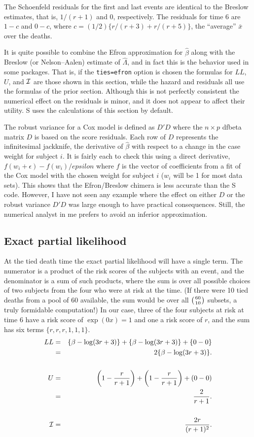 \documentclass[11pt]{article}
\def\bhat{\hat \beta}        %
\def\xbar{\bar x}
\def\lhat{\hat \Lambda}
\def\imat{{\cal I}}
\begin{document}
The Schoenfeld residuals for the first and last events are identical to
the Breslow estimates, that is, $1/(r+1)$ and 0, respectively.
The residuals for time 6 are $1-c$ and $0-c$, where
$c= (1/2)\{r/(r+3) + r/(r+5)\}$, the ``average'' $\xbar$ over the deaths.

It is quite possible to combine the Efron approximation for $\bhat$
along with the Breslow (or Nelson--Aalen) estimate of $\lhat$,
and in fact this is the behavior used in some packages.
That is, if the \texttt{ties=efron} option is chosen the formulas for
$LL$, $U$, and $\imat$ are those shown in this section,
while the hazard and residuals all use the formulas of the prior section.
Although this is not perfectly consistent the numerical effect
on the residuals is minor, and it does not appear to affect
their utility.  
S uses the calculations of this section by default.

The robust variance for a Cox model is defined as $D'D$ where the 
$n \times p$ dfbeta matrix $D$ is based on the score residuals.  
Each row of $D$ represents the infinitesimal jackknife, the derivative
of $\bhat$ with respect to a change in the case weight for subject $i$.
It is fairly each to check this using a direct derivative,
$f(w_i + \epsilon) - f(w_i)/epsilon$ where $f$ is the vector of
coefficients from a fit of the Cox model
with the chosen weight for subject $i$ ($w_i$ will be 1 for most data sets).
This shows that the Efron/Breslow chimera is less accurate than the S
code.  However, I have not seen any example where the effect on either
$D$ or the robust variance $D'D$ was large enough to have practical 
consequences.  Still, the numerical analyst in me prefers to avoid an
inferior approximation.

\subsection{Exact partial likelihood}
At the tied death time the exact partial likelihood will have a
single term.
The numerator is a product of the risk scores of the subjects with an
event, and
the denominator is a sum of such products, where the sum is over
all possible choices of two subjects from the four who were at risk
at the time.
(If there were 10 tied deaths from a pool of 60 available, the
sum would be over all $\left( 60 \atop 10 \right)$ subsets,
a truly formidable computation!)
In our case, three of the four subjects at risk at time 6 have a risk score
of $\exp(0x)=1$ and one a risk score of $r$,
and the sum has six terms $\{r,r,r,1,1,1\}$.
\begin{eqnarray*}
LL &=& \{\beta- \log(3r+3)\} + \{\beta - \log(3r+3)\}  + \{0-0\} \\
   &=& 2\{\beta - \log(3r+3)\}. \\ \\
U &=& \left(1-\frac{r}{r+1}\right) + \left(1-\frac{r}{r+1}\right) + (0-0)\\ 
  &=& \frac{2}{r+1}. \\ \\
\imat&=&  \frac{2r}{(r+1)^2}. \\
\end{eqnarray*}
\end{document}
